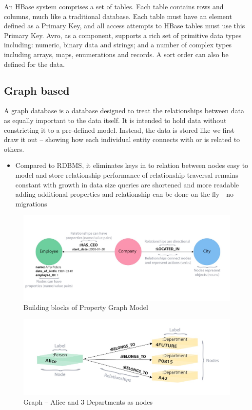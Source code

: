 \documentclass[paper=letter, fontsize=12pt]{article}
\begin{document}
	An HBase system comprises a set of tables. Each table contains rows and columns, much like a traditional database. Each table must have an element defined as a Primary Key, and all access attempts to HBase tables must use this Primary Key.
	Avro, as a component, supports a rich set of primitive data types including: numeric, binary data and strings; and a number of complex types including arrays, maps, enumerations and records. A sort order can also be defined for the data.

\subsection{Graph based}
	A graph database is a database designed to treat the relationships between data as equally important to the data itself. It is intended to hold data without constricting it to a pre-defined model. Instead, the data is stored like we first draw it out – showing how each individual entity connects with or is related to others.
	\begin{itemize}
		\item Compared to RDBMS, it eliminates keys in to relation between nodes
		\tick easy to model and store relationship
		\tick performance of relationship traversal remains constant with growth in data size
		\tick queries are shortened and more readable
		\tick adding additional properties and relationship can be done on the fly - no migrations
	\end{itemize}
	
	\begin{figure}[H]
		\bgroup
		\setlength{\parindent}{-5em}
		\includegraphics[width=550px]{refs/property_graph_elements}
		\egroup
		\caption{Building blocks of Property Graph Model}
	\end{figure}
	
	\begin{figure}[H]
		\bgroup
		\setlength{\parindent}{-5em}
		\includegraphics[width=550px]{refs/relational_graph_model.jpg}
		\egroup
		\caption{Graph – Alice and 3 Departments as nodes}
	\end{figure}
\end{document}
